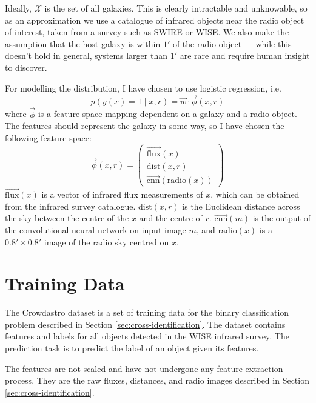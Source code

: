 \documentclass[11pt]{book}
\begin{document}
    Ideally, $\mathcal X$ is the set of all galaxies. This is clearly intractable and unknowable, so as an approximation we use a catalogue of infrared objects near the radio object of interest, taken from a survey such as SWIRE or WISE. We also make the assumption that the host galaxy is within $1'$ of the radio object --- while this doesn't hold in general, systems larger than $1'$ are rare and require human insight to discover\cite{banfield16}.

    For modelling the distribution, I have chosen to use logistic regression, i.e.
    \begin{equation}
        \label{eq:logistic-regression-cross-identification}
        p(y(x) = 1 \mid x, r) = \vec w \cdot \vec \phi(x, r)
    \end{equation}
    where $\vec \phi$ is a feature space mapping dependent on a galaxy and a radio object. The features should represent the galaxy in some way, so I have chosen the following feature space:
    \begin{equation}
        \label{eq:galaxy-features}
        \vec \phi(x, r) = \begin{pmatrix}
            \vec{\mbox{flux}}(x)\\
            \mbox{dist}(x, r)\\
            \vec{\mbox{cnn}}(\mbox{radio}(x))
        \end{pmatrix}
    \end{equation}
    $\vec{\mbox{flux}}(x)$ is a vector of infrared flux measurements of $x$, which can be obtained from the infrared survey catalogue. $\mbox{dist}(x, r)$ is the Euclidean distance across the sky between the centre of the $x$ and the centre of $r$. $\vec{\mbox{cnn}}(m)$ is the output of the convolutional neural network on input image $m$, and $\mbox{radio}(x)$ is a $0.8' \times 0.8'$ image of the radio sky centred on $x$.

\section{Training Data}
\label{sec:training-data}
  
  The Crowdastro dataset is a set of training data for the binary classification problem described in Section \ref{sec:cross-identification}. The dataset contains features and labels for all objects detected in the WISE infrared survey. The prediction task is to predict the label of an object given its features.

  The features are not scaled and have not undergone any feature extraction process. They are the raw fluxes, distances, and radio images described in Section \ref{sec:cross-identification}.
\end{document}
